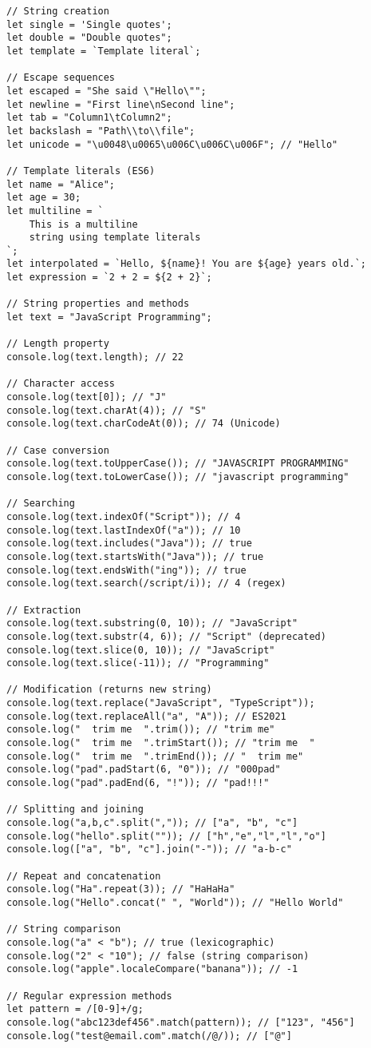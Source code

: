 \documentclass[12pt,a4paper,oneside]{book}
\begin{document}
\begin{lstlisting}[style=vscodedark, caption={\textbf{String Type - Complete Examples}}, label=lst:string-type]
// String creation
let single = 'Single quotes';
let double = "Double quotes";
let template = `Template literal`;

// Escape sequences
let escaped = "She said \"Hello\"";
let newline = "First line\nSecond line";
let tab = "Column1\tColumn2";
let backslash = "Path\\to\\file";
let unicode = "\u0048\u0065\u006C\u006C\u006F"; // "Hello"

// Template literals (ES6)
let name = "Alice";
let age = 30;
let multiline = `
    This is a multiline
    string using template literals
`;
let interpolated = `Hello, ${name}! You are ${age} years old.`;
let expression = `2 + 2 = ${2 + 2}`;

// String properties and methods
let text = "JavaScript Programming";

// Length property
console.log(text.length); // 22

// Character access
console.log(text[0]); // "J"
console.log(text.charAt(4)); // "S"
console.log(text.charCodeAt(0)); // 74 (Unicode)

// Case conversion
console.log(text.toUpperCase()); // "JAVASCRIPT PROGRAMMING"
console.log(text.toLowerCase()); // "javascript programming"

// Searching
console.log(text.indexOf("Script")); // 4
console.log(text.lastIndexOf("a")); // 10
console.log(text.includes("Java")); // true
console.log(text.startsWith("Java")); // true
console.log(text.endsWith("ing")); // true
console.log(text.search(/script/i)); // 4 (regex)

// Extraction
console.log(text.substring(0, 10)); // "JavaScript"
console.log(text.substr(4, 6)); // "Script" (deprecated)
console.log(text.slice(0, 10)); // "JavaScript"
console.log(text.slice(-11)); // "Programming"

// Modification (returns new string)
console.log(text.replace("JavaScript", "TypeScript"));
console.log(text.replaceAll("a", "A")); // ES2021
console.log("  trim me  ".trim()); // "trim me"
console.log("  trim me  ".trimStart()); // "trim me  "
console.log("  trim me  ".trimEnd()); // "  trim me"
console.log("pad".padStart(6, "0")); // "000pad"
console.log("pad".padEnd(6, "!")); // "pad!!!"

// Splitting and joining
console.log("a,b,c".split(",")); // ["a", "b", "c"]
console.log("hello".split("")); // ["h","e","l","l","o"]
console.log(["a", "b", "c"].join("-")); // "a-b-c"

// Repeat and concatenation
console.log("Ha".repeat(3)); // "HaHaHa"
console.log("Hello".concat(" ", "World")); // "Hello World"

// String comparison
console.log("a" < "b"); // true (lexicographic)
console.log("2" < "10"); // false (string comparison)
console.log("apple".localeCompare("banana")); // -1

// Regular expression methods
let pattern = /[0-9]+/g;
console.log("abc123def456".match(pattern)); // ["123", "456"]
console.log("test@email.com".match(/@/)); // ["@"]
\end{lstlisting}
\end{document}

